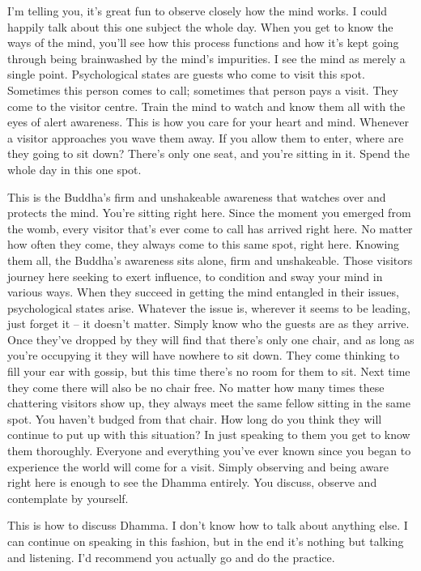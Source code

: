 I'm telling you, it's great fun to observe closely how the mind works. I could happily talk about this one subject the whole day. When you get to know the ways of the mind, you'll see how this process functions and how it's kept going through being brainwashed by the mind's impurities. I see the mind as merely a single point. Psychological states are guests who come to visit this spot. Sometimes this person comes to call; sometimes that person pays a visit. They come to the visitor centre. Train the mind to watch and know them all with the eyes of alert awareness. This is how you care for your heart and mind. Whenever a visitor approaches you wave them away. If you allow them to enter, where are they going to sit down? There's only one seat, and you're sitting in it. Spend the whole day in this one spot.

This is the Buddha's firm and unshakeable awareness that watches over and protects the mind. You're sitting right here. Since the moment you emerged from the womb, every visitor that's ever come to call has arrived right here. No matter how often they come, they always come to this same spot, right here. Knowing them all, the Buddha's awareness sits alone, firm and unshakeable. Those visitors journey here seeking to exert influence, to condition and sway your mind in various ways. When they succeed in getting the mind entangled in their issues, psychological states arise. Whatever the issue is, wherever it seems to be leading, just forget it -- it doesn't matter. Simply know who the guests are as they arrive. Once they've dropped by they will find that there's only one chair, and as long as you're occupying it they will have nowhere to sit down. They come thinking to fill your ear with gossip, but this time there's no room for them to sit. Next time they come there will also be no chair free. No matter how many times these chattering visitors show up, they always meet the same fellow sitting in the same spot. You haven't budged from that chair. How long do you think they will continue to put up with this situation? In just speaking to them you get to know them thoroughly. Everyone and everything you've ever known since you began to experience the world will come for a visit. Simply observing and being aware right here is enough to see the Dhamma entirely. You discuss, observe and contemplate by yourself.

This is how to discuss Dhamma. I don't know how to talk about anything else. I can continue on speaking in this fashion, but in the end it's nothing but talking and listening. I'd recommend you actually go and do the practice.

